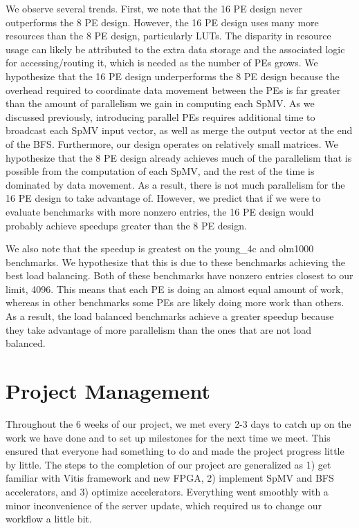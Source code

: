 \documentclass[10pt]{article}
\begin{document}
\noindent We observe several trends. First, we note that the 16 PE design never outperforms the 8 PE design. However, the 16 PE design
uses many more resources than the 8 PE design, particularly LUTs. The disparity in resource usage can likely be attributed to
the extra data storage and the associated logic for accessing/routing it, which is needed as the number of PEs grows. We hypothesize
that the 16 PE design underperforms the 8 PE design because the overhead required to coordinate data movement between the PEs is far
greater than the amount of parallelism we gain in computing each SpMV. As we discussed previously, introducing parallel PEs requires
additional time to broadcast each SpMV input vector, as well as merge the output vector at the end of the BFS. Furthermore, our
design operates on relatively small matrices. We hypothesize that the 8 PE design already achieves much of the parallelism that is
possible from the computation of each SpMV, and the rest of the time is dominated by data movement. As a result, there is not
much parallelism for the 16 PE design to take advantage of. However, we predict that if we were to evaluate benchmarks with more
nonzero entries, the 16 PE design would probably achieve speedups greater than the 8 PE design.\newline

\noindent We also note that the speedup is greatest on the young\_4c and olm1000 benchmarks. We hypothesize that this is due to these
benchmarks achieving the best load balancing. Both of these benchmarks have nonzero entries closest to our limit, 4096. This
means that each PE is doing an almost equal amount of work, whereas in other benchmarks some PEs are likely doing more work
than others. As a result, the load balanced benchmarks achieve a greater speedup because they take advantage of more parallelism
than the ones that are not load balanced.

\section{Project Management}

\noindent Throughout the 6 weeks of our project, we met every 2-3 days to catch up on the work we have done and to set up
milestones for the next time we meet. This ensured that everyone had something to do and made the project
progress little by little. The steps to the completion of our project are generalized as 1) get familiar with
Vitis framework and new FPGA, 2) implement SpMV and BFS accelerators, and 3) optimize accelerators. Everything went
smoothly with a minor inconvenience of the server update, which required us to change our workflow a little bit. \newline
\end{document}
